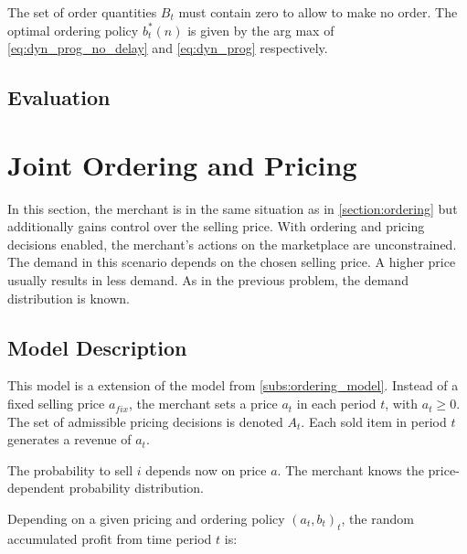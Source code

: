 The set of order quantities $B_t$ must contain zero to allow to make no order.
The optimal ordering policy $b_t^*(n)$ is given by the arg max of \cref{eq:dyn_prog_no_delay} and \cref{eq:dyn_prog} respectively. 


\subsection{Evaluation}


\section{Joint Ordering and Pricing}
In this section, the merchant is in the same situation as in \cref{section:ordering} but additionally gains control over the selling price.
With ordering and pricing decisions enabled, the merchant's actions on the marketplace are unconstrained.
The demand in this scenario depends on the chosen selling price.
A higher price usually results in less demand.
As in the previous problem, the demand distribution is known.

\subsection{Model Description}
This model is a extension of the model from \cref{subs:ordering_model}.
Instead of a fixed selling price $a_{fix}$, the merchant sets a price $a_t$ in each period $t$, with $a_t \geq 0$.
The set of admissible pricing decisions is denoted $A_t$.
Each sold item in period $t$ generates a revenue of $a_t$.

The probability to sell $i$ depends now on price $a$.
The merchant knows the price-dependent probability distribution.

Depending on a given pricing and ordering policy $(a_t, b_t)_t$, the random accumulated profit from time period $t$ is:

